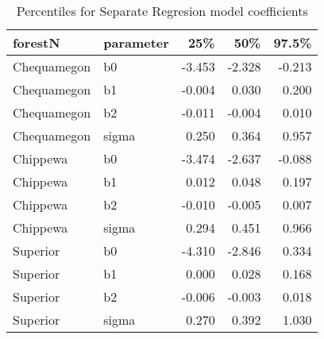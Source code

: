 \begin{table}[ht]
\begin{center}
\begin{tabular}{llrrr}
  \hline
forestN & parameter & 25\% & 50\% & 97.5\% \\ 
  \hline
Chequamegon & b0 & -3.453 & -2.328 & -0.213 \\ 
  Chequamegon & b1 & -0.004 & 0.030 & 0.200 \\ 
  Chequamegon & b2 & -0.011 & -0.004 & 0.010 \\ 
  Chequamegon & sigma & 0.250 & 0.364 & 0.957 \\ 
  Chippewa & b0 & -3.474 & -2.637 & -0.088 \\ 
  Chippewa & b1 & 0.012 & 0.048 & 0.197 \\ 
  Chippewa & b2 & -0.010 & -0.005 & 0.007 \\ 
  Chippewa & sigma & 0.294 & 0.451 & 0.966 \\ 
  Superior & b0 & -4.310 & -2.846 & 0.334 \\ 
  Superior & b1 & 0.000 & 0.028 & 0.168 \\ 
  Superior & b2 & -0.006 & -0.003 & 0.018 \\ 
  Superior & sigma & 0.270 & 0.392 & 1.030 \\ 
   \hline
\end{tabular}
\caption{Percentiles for Separate Regresion model coefficients}
\end{center}
\end{table}
